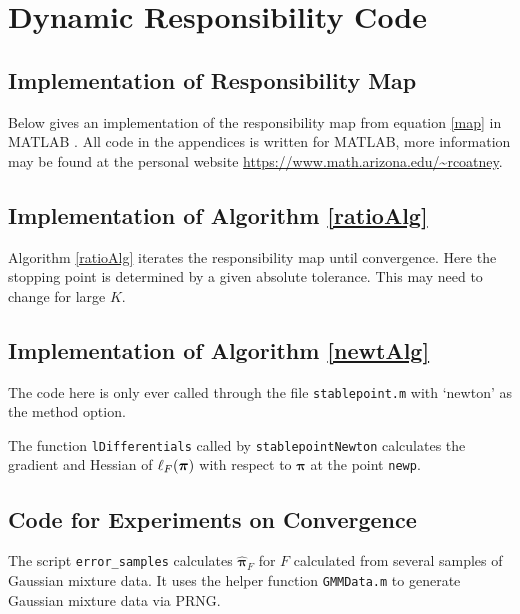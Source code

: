 \renewcommand{\thesubsection}{\Alph{subsection}}

\chapter{Dynamic Responsibility Code}\label{app:DRcode}
\section{Implementation of Responsibility Map}\label{code:map}
Below gives an implementation of the responsibility map from equation \eqref{map} in MATLAB \cite{MATLAB:2020a}. All code in the appendices is written for MATLAB, more information may be found at the personal website \url{https://www.math.arizona.edu/~rcoatney}.



\newpage
\section{Implementation of Algorithm \ref{ratioAlg}}\label{code:ratioAlg}
Algorithm \ref{ratioAlg} iterates the responsibility map until convergence.  Here the stopping point is determined by a given absolute tolerance.  This may need to change for large $K$.


\newpage
\section{Implementation of Algorithm \ref{newtAlg}}\label{code:newtAlg}
The code here is only ever called through the file \verb|stablepoint.m| with `newton' as the method option. 


The function \verb|lDifferentials| called by \verb|stablepointNewton| calculates the gradient and Hessian of \( \ell_{F}({\bm\pi}) \) with respect to \( \bm\pi \) at the point \verb|newp|.

			
\section{Code for Experiments on Convergence}\label{code:ExpConv}
The script \verb|error_samples| calculates \( \hat{\bm \pi}_F \) for \( F \) calculated from several samples of Gaussian mixture data. It uses the helper function \verb|GMMData.m| to generate Gaussian mixture data via PRNG.

